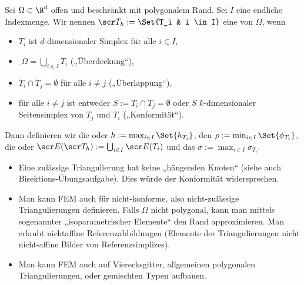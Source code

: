 \begin{df}[Triangulierung] \label{3.61}
	Sei $\Omega \subset \R^d$ offen und beschränkt mit polygonalem Rand.
	Sei $I$ eine endliche Indexmenge.
	Wir nennen $\scr T_h := \Set{T_i & i \in I}$ eine  von $\Omega$, wenn
	\begin{itemize}
		\item
			$T_i$ ist $d$-dimensionaler Simplex für alle $i \in I$,
		\item
			$\_\Omega = \bigcup_{i\in I} T_i$ („Überdeckung“),
		\item
			$\mathring T_i \cap \mathring T_j = \emptyset$ für alle $i \neq j$ („Überlappung“),
		\item
			für alle $i \neq j$ ist entweder $S := T_i \cap T_j = \emptyset$ oder $S$ $k$-dimensionaler Seitensimplex von $T_j$ und $T_i$ („Konformität“).
	\end{itemize}
	Dann definieren wir die  oder  $h := \max_{i \in I} \Set{h_{T_i}}$, den  $\rho := \min_{i\in I} \Set{\phi_{T_i}}$, die  oder  $\scr E(\scr T_h) := \bigcup_{i \in I} \scr E(T_i)$ und das  $\sigma := \max_{i\in I} \sigma_{T_i}$.
	\begin{note}
		\begin{itemize}
			\item
				Eine zulässige Triangulierung hat keine „hängenden Knoten“ (siehe auch Bisektions-Übungsaufgabe).
				Dies würde der Konformität widersprechen.
			\item
				Man kann FEM auch für nicht-konforme, also nicht-zulässige Triangulierungen definieren.
				Falls $\Omega$ nicht polygonal, kann man mittels sogenannter „isoparametrischer Elemente“ den Rand approximieren.
				Man erlaubt nichtaffine Referenzabbildungen (Elemente der Triangulierungen nicht nicht-affine Bilder von Referenzsimplizes).
			\item
				Man kann FEM auch auf Vierecksgitter, allgemeinen polygonalen Triangulierungen, oder gemischten Typen aufbauen.
		\end{itemize}
	\end{note}
\end{df}

